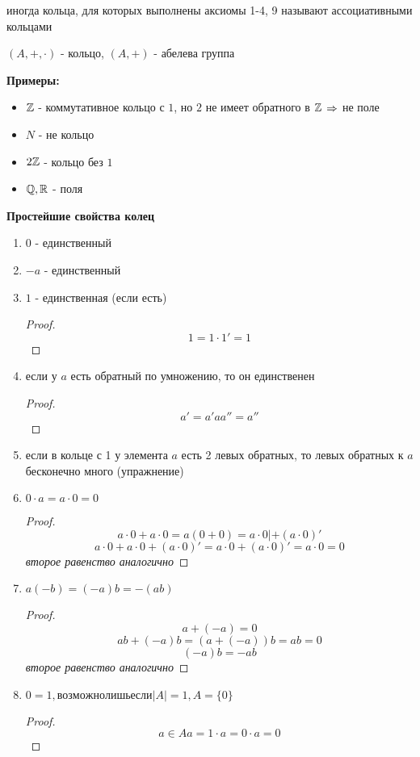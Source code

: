 \begin{Rem}
	иногда кольца, для которых выполнены аксиомы 1-4, 9 называют ассоциативными кольцами
\end{Rem}

\begin{Rem}
$(A, +, \cdot)$ - кольцо, $(A, +)$ - абелева группа\\
\end{Rem}

\textbf{ Примеры: }
\begin{itemize}
\item $\mathbb{Z}$ - коммутативное кольцо с $1$, но $2$ не имеет обратного в $\mathbb{Z}$ $\Rightarrow$ не поле
\item $N$ - не кольцо
\item $2\mathbb{Z}$ - кольцо без $1$
\item $\mathbb{Q}, \mathbb{R}$ - поля
\end{itemize}

\textbf{Простейшие свойства колец}

\begin{enumerate}
\item $0$ - единственный
\item $-a$ - единственный
\item $1$ - единственная (если есть) 
	\begin{proof}
		$$ 1 = 1 \cdot 1' = 1 $$
	\end{proof}
\item если у $a$ есть обратный по умножению, то он единственен 
	\begin{proof}
		$$ a' = a'aa''=a'' $$
	\end{proof}
\item если в кольце с 1 у элемента $a$ есть 2 левых обратных, то левых обратных к $a$ бесконечно много (упражнение)
	
\item $0 \cdot a = a \cdot 0 = 0 $
	\begin{proof}
		$$ a \cdot 0 + a \cdot 0 = a(0 + 0) = a\cdot0 |  + (a\cdot0)' $$
		$$ a \cdot 0 + a \cdot 0 + (a \cdot 0)' = a \cdot 0 + (a \cdot 0)' = a \cdot 0 = 0 $$
	\textit{ второе равенство аналогично }
	\end{proof}
\item $ a(-b) = (-a)b = -(ab)$
	\begin{proof}
		$$ a + (-a) = 0 $$
		$$ ab + (-a)b = (a + (-a))b = ab = 0 $$
		$$ (-a)b = -ab $$
	\textit { второе равенство аналогично }
	\end{proof}
\item $ 0 = 1, возможно лишь если |A| = 1, A = \lbrace 0 \rbrace $
	\begin{proof}
		$$ a \in A a = 1 \cdot a = 0 \cdot a = 0 $$
	\end{proof}
\end{enumerate}

